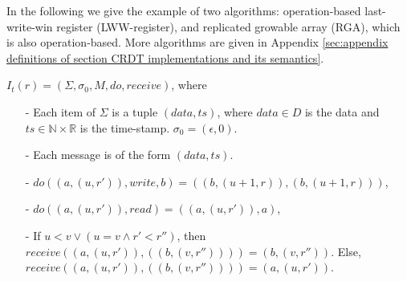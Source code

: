 In the following we give the example of two algorithms: operation-based last-write-win register (LWW-register), and replicated growable array (RGA), which is also operation-based. More algorithms are given in Appendix \ref{sec:appendix definitions of section CRDT implementations and its semantics}.

\begin{example}
\label{definition:LWW-register}
$I_t(r) = (\Sigma, \sigma_0, M, \mathit{do},\mathit{receive})$, where

\begin{itemize}
\setlength{\itemsep}{0.5pt}
\item[-] Each item of $\Sigma$ is a tuple $(\mathit{data},\mathit{ts})$, where $\mathit{data} \in D$ is the data and $\mathit{ts} \in \mathbb{N} \times \mathbb{R}$ is the time-stamp. $\sigma_0 = (\epsilon, 0)$.

\item[-] Each message is of the form $(\mathit{data},\mathit{ts})$. 

\item[-] $\mathit{do}((a,(u,r')),\mathit{write},b) = ((b,(u+1,r)),(b,(u+1,r)))$, 

\item[-] $\mathit{do}((a,(u,r')),\mathit{read}) = ((a,(u,r')),a)$, 

\item[-] If $u<v \vee (u=v \wedge r' < r'')$, then $\mathit{receive}((a,(u,r')), ((b,(v,r'')))) = (b,(v,r''))$. Else, $\mathit{receive}((a,(u,r')), ((b,(v,r'')))) = (a,(u,r'))$.  
\end{itemize}
\end{example}


